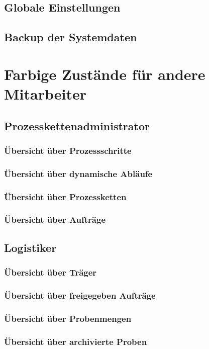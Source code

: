 \documentclass[enabledeprecatedfontcommands,fontsize=12pt,paper=a4,twoside]{scrartcl}
\begin{document}
\subsection{Globale Einstellungen}
\subsection{Backup der Systemdaten}


\newpage
\section{Farbige Zustände für andere Mitarbeiter}
\subsection{Prozesskettenadministrator}
\subsubsection{Übersicht über Prozessschritte}
\subsubsection{Übersicht über dynamische Abläufe}
\subsubsection{Übersicht über Prozessketten}
\subsubsection{Übersicht über Aufträge}
\subsection{Logistiker}
\subsubsection{Übersicht über Träger}
\subsubsection{Übersicht über freigegeben Aufträge}
\subsubsection{Übersicht über Probenmengen}
\subsubsection{Übersicht über archivierte Proben}
\end{document}

